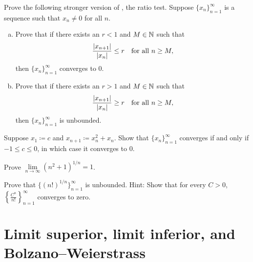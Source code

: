 \begin{samepage}
\begin{exercise}[Easy] \label{exercise:strongerratiotest1}
Prove the following stronger version of , the ratio
test.  
Suppose $\{ x_n \}_{n=1}^\infty$ is a sequence such that $x_n \neq 0$ for all
$n$.
\begin{enumerate}[a)]
\item
Prove that if there exists an $r < 1$ and $M \in {\mathbb{N}}$ such that
\begin{equation*}
\frac{\lvert {x_{n+1}} \rvert}{\lvert {x_n} \rvert} \leq r \quad \text{for all } n \geq M,
\end{equation*}
then $\{ x_n \}_{n=1}^\infty$ converges to $0$.
\item
Prove that if there exists an $r > 1$ and $M \in {\mathbb{N}}$ such that
\begin{equation*}
\frac{\lvert {x_{n+1}} \rvert}{\lvert {x_n} \rvert} \geq r  \quad \text{for all } n \geq M,
\end{equation*}
then $\{ x_n \}_{n=1}^\infty$ is unbounded.
\end{enumerate}
\end{exercise}
\end{samepage}

\begin{exercise} \label{exercise:convergentinitialvalues}
Suppose $x_1 \coloneqq c$ and $x_{n+1} \coloneqq x_n^2+x_n$.
Show that $\{ x_n \}_{n=1}^\infty$ converges if and only if $-1 \leq c \leq 0$, in which
case it converges to 0.
\end{exercise}

\begin{exercise}
Prove $\lim\limits_{n \to \infty} {(n^2+1)}^{1/n} = 1$.
\end{exercise}

\begin{exercise}
Prove that $\bigl\{ {(n!)}^{1/n} \bigr\}_{n=1}^\infty$
is unbounded.
Hint: Show that for every $C > 0$, $\left\{ \frac{C^n}{n!}
\right\}_{n=1}^\infty$ converges to zero.
\end{exercise}


\sectionnewpage
\section{Limit superior, limit inferior, and Bolzano--Weierstrass}
\label{sec:bw}


